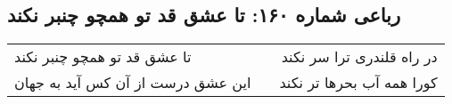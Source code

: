 \begin{center}
\section*{رباعی شماره ۱۶۰: تا عشق قد تو همچو چنبر نکند}
\label{sec:sh160}
\begin{longtable}{l p{0.5cm} r}
تا عشق قد تو همچو چنبر نکند
&&
در راه قلندری ترا سر نکند
\\
این عشق درست از آن کس آید به جهان
&&
کورا همه آب بحرها تر نکند
\\
\end{longtable}
\end{center}
